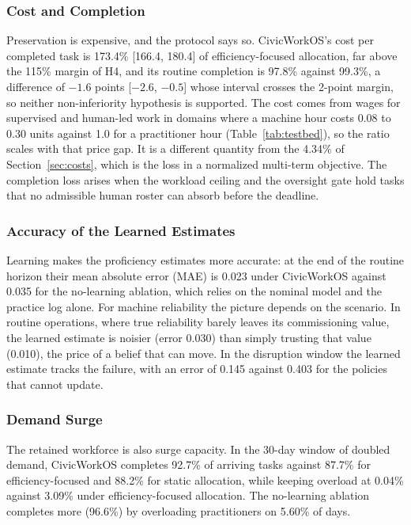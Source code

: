 \documentclass[utf8]{FrontiersinHarvard}
\begin{document}
	\subsubsection*{Cost and Completion}

	Preservation is expensive, and the protocol says so. CivicWorkOS's cost per completed task is 173.4\% [166.4, 180.4] of efficiency-focused allocation, far above the 115\% margin of H4, and its routine completion is 97.8\% against 99.3\%, a difference of $-1.6$ points [$-2.6$, $-0.5$] whose interval crosses the 2-point margin, so neither non-inferiority hypothesis is supported. The cost comes from wages for supervised and human-led work in domains where a machine hour costs 0.08 to 0.30 units against 1.0 for a practitioner hour (Table~\ref{tab:testbed}), so the ratio scales with that price gap. It is a different quantity from the 4.34\% of Section~\ref{sec:costs}, which is the loss in a normalized multi-term objective. The completion loss arises when the workload ceiling and the oversight gate hold tasks that no admissible human roster can absorb before the deadline.

	\subsubsection*{Accuracy of the Learned Estimates}

	Learning makes the proficiency estimates more accurate: at the end of the routine horizon their mean absolute error (MAE) is 0.023 under CivicWorkOS against 0.035 for the no-learning ablation, which relies on the nominal model and the practice log alone. For machine reliability the picture depends on the scenario. In routine operations, where true reliability barely leaves its commissioning value, the learned estimate is noisier (error 0.030) than simply trusting that value (0.010), the price of a belief that can move. In the disruption window the learned estimate tracks the failure, with an error of 0.145 against 0.403 for the policies that cannot update.

	\subsubsection*{Demand Surge}

	The retained workforce is also surge capacity. In the 30-day window of doubled demand, CivicWorkOS completes 92.7\% of arriving tasks against 87.7\% for efficiency-focused and 88.2\% for static allocation, while keeping overload at 0.04\% against 3.09\% under efficiency-focused allocation. The no-learning ablation completes more (96.6\%) by overloading practitioners on 5.60\% of days.
\end{document}
